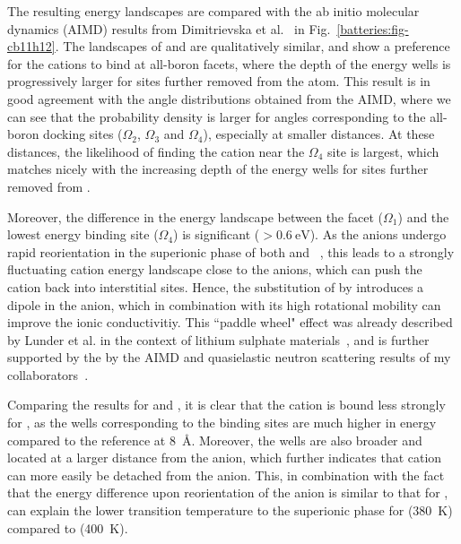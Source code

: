 \begin{refsection}
The resulting energy landscapes are compared with the ab initio molecular dynamics (AIMD) results from Dimitrievska et al.~\cite{Dimitrievska2018} in Fig.~\ref{batteries:fig-cb11h12}. The landscapes of  and  are qualitatively similar, and show a preference for the cations to bind at all-boron facets, where the depth of the energy wells is progressively larger for sites further removed from the  atom. This result is in good agreement with the angle distributions obtained from the \gls{AIMD}, where we can see that the probability density is larger for angles corresponding to the all-boron docking sites ($\Omega_2$, $\Omega_3$ and $\Omega_4$), especially at smaller distances. At these distances, the likelihood of finding the cation near the $\Omega_4$ site is largest, which matches nicely with the increasing depth of the energy wells for sites further removed from . 

Moreover, the difference in the energy landscape between the  facet ($\Omega_1$) and the lowest energy binding site ($\Omega_4$) is significant ($>0.6~\si{\electronvolt}$). As the anions undergo rapid reorientation in the superionic phase of both  and ~\cite{Dimitrievska2018}, this leads to a strongly fluctuating cation energy landscape close to the anions, which can push the cation back into interstitial sites. Hence, the substitution of  by  introduces a dipole in the anion, which in combination with its high rotational mobility can improve the ionic conductivitiy. This ``paddle wheel" effect was already described by Lunder et al. in the context of lithium sulphate materials~\cite{Lunden1995}, and is further supported by the by the \gls{AIMD} and quasielastic neutron scattering results of my collaborators~\cite{Dimitrievska2018}. 

Comparing the results for  and , it is clear that the cation is bound less strongly for , as the wells corresponding to the binding sites are much higher in energy compared to the reference at 8~\si{\angstrom}. Moreover, the wells are also broader and located at a larger distance from the anion, which further indicates that cation can more easily be detached from the anion. This, in combination with the fact that the energy difference upon reorientation of the anion is similar to that for , can explain the lower transition temperature to the superionic phase for  (380~\si{\kelvin}) compared to  (400~\si{\kelvin}).


\end{refsection}
